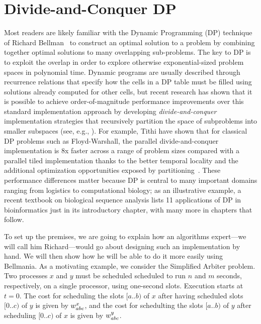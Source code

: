 \section{Divide-and-Conquer DP}
\label{divide}

Most readers are likely familiar with the Dynamic Programming (DP) technique of Richard Bellman~\cite{03/Bellman:DP} to construct an optimal solution to a problem by combining together optimal solutions to many overlapping sub-problems. The key to DP is to exploit the overlap in order to explore otherwise exponential-sized problem spaces in polynomial time. Dynamic programs are usually described through recurrence relations that specify how the cells in a DP table must be filled using solutions already computed for other cells, but recent research has shown that it is possible to achieve order-of-magnitude performance improvements over this standard implementation approach by developing \emph{divide-and-conquer}  implementation strategies that recursively
partition the space of subproblems into smaller subspaces (see, e.g., \cite{IPDPS15/Tithi}).   For example, Tithi \etal{} have shown that for classical DP problems such as Floyd-Warshall, the parallel divide-and-conquer implementation is  8x faster  across a range of problem sizes compared with a parallel tiled implementation thanks to the better temporal locality and the additional optimization opportunities exposed by partitioning~\cite{IPDPS15/Tithi}. These performance differences matter because  DP is central to many important domains ranging from logistics to computational biology; as an illustrative example, a recent textbook \cite{DurbinEdKr98} on biological sequence analysis lists 11 applications of DP in bioinformatics just in its introductory chapter, with many more in chapters that follow.



To set up the premises, we are going to explain how an algorithms expert---we will call him Richard---would go about designing such an implementation by hand.
We will then show how he will be able to do it more easily using Bellmania.
As a motivating example, we consider the Simplified Arbiter problem.
Two processes $x$ and $y$ must be scheduled scheduled to run $n$ and $m$ seconds,
respectively, on a single processor, using one-second slots.
Execution starts at $t=0$. The cost for scheduling the slots $[a..b)$ of $x$ after
having scheduled slots $[0..c)$ of $y$
is given by $w^x_{abc}$, and the cost for schedulting the slots $[a..b)$ of $y$
after scheduling $[0..c)$ of $x$ is given by $w^y_{abc}$.

